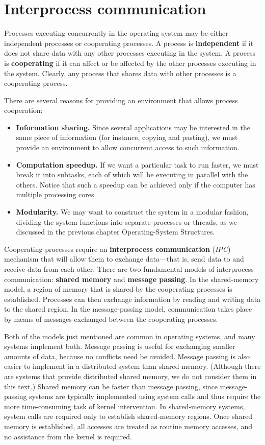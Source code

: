 \section{Interprocess communication}\label{sec:3.4}

Processes executing concurrently in the operating system may be either independent processes or cooperating processes. A process is \textbf{independent} if it does not share data with any other processes executing in the system. A process is \textbf{cooperating} if it can affect or be affected by the other processes executing in the system. Clearly, any process that shares data with other processes is a cooperating process.

There are several reasons for providing an environment that allows process cooperation:
\begin{itemize}
    \item \textbf{Information sharing.} Since several applications may be interested in the same piece of information (for instance, copying and pasting), we must provide an environment to allow concurrent access to such information.
    \item \textbf{Computation speedup.} If we want a particular task to run faster, we must break it into subtasks, each of which will be executing in parallel with the others. Notice that such a speedup can be achieved only if the computer has multiple processing cores.
    \item \textbf{Modularity.} We may want to construct the system in a modular fashion, dividing the system functions into separate processes or threads, as we discussed in the previous chapter Operating-System Structures.
\end{itemize}
Cooperating processes require an \textbf{interprocess communication} (\textit{IPC}) mechanism that will allow them to exchange data---that is, send data to and receive data from each other. There are two fundamental models of interprocess communication: \textbf{shared memory} and \textbf{message passing}. In the shared-memory model, a region of memory that is shared by the cooperating processes is established. Processes can then exchange information by reading and writing data to the shared region. In the message-passing model, communication takes place by means of messages exchanged between the cooperating processes.

Both of the models just mentioned are common in operating systems, and many systems implement both. Message passing is useful for exchanging smaller amounts of data, because no conflicts need be avoided. Message passing is also easier to implement in a distributed system than shared memory. (Although there are systems that provide distributed shared memory, we do not consider them in this text.) Shared memory can be faster than message passing, since message-passing systems are typically implemented using system calls and thus require the more time-consuming task of kernel intervention. In shared-memory systems, system calls are required only to establish shared-memory regions. Once shared memory is established, all accesses are treated as routine memory accesses, and no assistance from the kernel is required.

